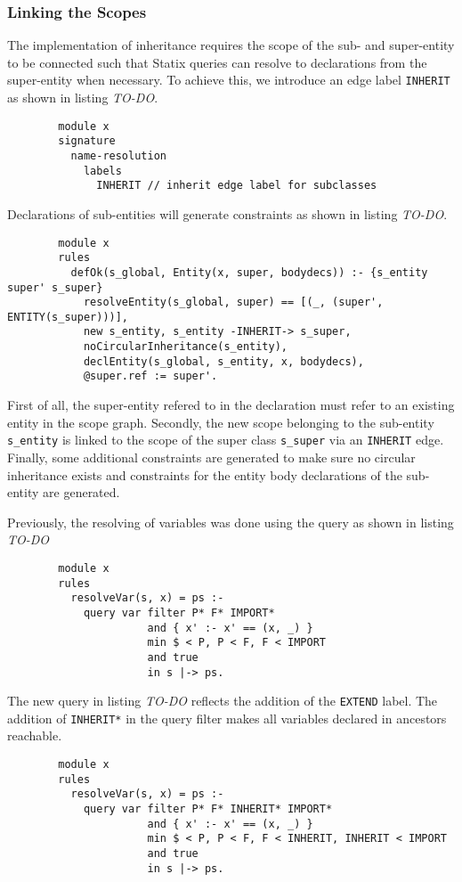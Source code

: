    \subsubsection{Linking the Scopes}
      The implementation of inheritance requires the scope of the sub- and super-entity to be connected such that Statix queries can resolve to declarations from the super-entity when necessary. To achieve this, we introduce an edge label \texttt{INHERIT} as shown in listing \emph{TO-DO}.
      \begin{verbatim}
        module x
        signature
          name-resolution
            labels
              INHERIT // inherit edge label for subclasses
      \end{verbatim}
      Declarations of sub-entities will generate constraints as shown in listing \emph{TO-DO}.
      \begin{verbatim}
        module x
        rules
          defOk(s_global, Entity(x, super, bodydecs)) :- {s_entity super' s_super}
            resolveEntity(s_global, super) == [(_, (super', ENTITY(s_super)))],
            new s_entity, s_entity -INHERIT-> s_super,
            noCircularInheritance(s_entity),
            declEntity(s_global, s_entity, x, bodydecs),
            @super.ref := super'.
      \end{verbatim}
      First of all, the super-entity refered to in the declaration must refer to an existing entity in the scope graph. Secondly, the new scope belonging to the sub-entity \texttt{s\_entity} is linked to the scope of the super class \texttt{s\_super} via an \texttt{INHERIT} edge. Finally, some additional constraints are generated to make sure no circular inheritance exists and constraints for the entity body declarations of the sub-entity are generated.

      Previously, the resolving of variables was done using the query as shown in listing \emph{TO-DO}
      \begin{verbatim}
        module x
        rules
          resolveVar(s, x) = ps :-
            query var filter P* F* IMPORT*
                      and { x' :- x' == (x, _) }
                      min $ < P, P < F, F < IMPORT
                      and true
                      in s |-> ps.
      \end{verbatim}
      The new query in listing \emph{TO-DO} reflects the addition of the \texttt{EXTEND} label. The addition of \texttt{INHERIT*} in the query filter makes all variables declared in ancestors reachable.
      \begin{verbatim}
        module x
        rules
          resolveVar(s, x) = ps :-
            query var filter P* F* INHERIT* IMPORT*
                      and { x' :- x' == (x, _) }
                      min $ < P, P < F, F < INHERIT, INHERIT < IMPORT
                      and true
                      in s |-> ps.
      \end{verbatim}

